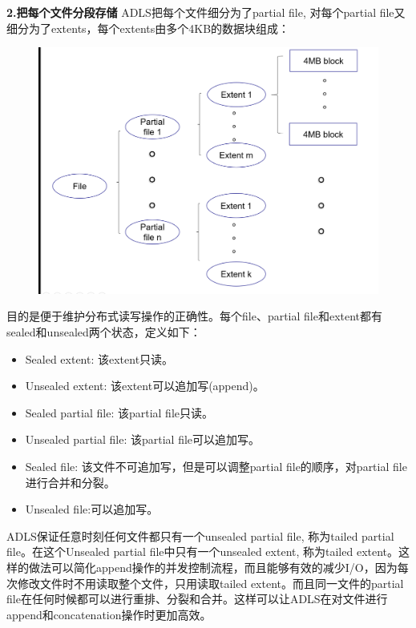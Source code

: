 \documentclass[11pt]{article}
\begin{document}
\textbf{2.把每个文件分段存储}
ADLS把每个文件细分为了partial file, 对每个partial file又细分为了extents，每个extents由多个4KB的数据块组成：
\begin{figure}[H]
\includegraphics[width=\linewidth]{figs/file_store.png}
\end{figure}
目的是便于维护分布式读写操作的正确性。每个file、partial file和extent都有sealed和unsealed两个状态，定义如下：
\begin{itemize}
	\item Sealed extent: 该extent只读。
	\item Unsealed extent: 该extent可以追加写(append)。
	\item Sealed partial file: 该partial file只读。
	\item Unsealed partial file: 该partial file可以追加写。
	\item Sealed file: 该文件不可追加写，但是可以调整partial file的顺序，对partial file进行合并和分裂。
	\item Unsealed file:可以追加写。
\end{itemize}
ADLS保证任意时刻任何文件都只有一个unsealed partial file, 称为tailed partial file。在这个Unsealed partial file中只有一个unsealed extent, 称为tailed extent。这样的做法可以简化append操作的并发控制流程，而且能够有效的减少I/O，因为每次修改文件时不用读取整个文件，只用读取tailed extent。而且同一文件的partial file在任何时候都可以进行重排、分裂和合并。这样可以让ADLS在对文件进行append和concatenation操作时更加高效。
\end{document}

